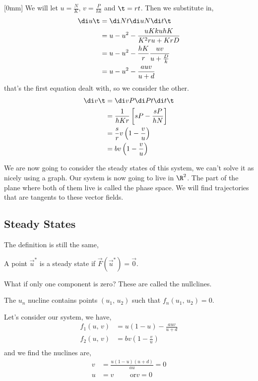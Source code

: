 
\noindent{}[0mm]
We will let $u = \frac{N}{K}$, $v = \frac{P}{hk}$ and $\t = rt$. Then we substitute in,
\begin{align*}
  \di u \t &= \di N t \di u N \di t \t\\
  &= u - u^2 - \frac{uKkuhK}{K^2ru + KrD}\\
  &= u - u^2 - \frac{hK}{r}\frac{uv}{u + \frac{D}{k}}\\
  &= u - u^2 - \frac{auv}{u + d}
\end{align*}
that's the first equation dealt with, so we consider the other.
\begin{align*}
  \di v \t &= \di v P \di P t \di t \t \\
  &= \frac{1}{hKr} \left[ sP - \frac{sP}{hN} \right]\\
  &= \frac{s}{r}v \left(1 - \frac{v}{u}\right)\\
  &= bv\left( 1 - \frac{v}{u} \right)
\end{align*}

We are now going to consider the steady states of this system, we can't solve it as nicely using a graph. Our system is now going to live in $\R^2$. The part of the plane where both of them live is called the phase space. We will find trajectories that are tangents to these vector fields.\\

\subsection{Steady States}
The definition is still the same,
\begin{ndefi}
  A point $\vec u^*$ is a steady state if $\vec F(\vec u^*) = \vec 0$.
\end{ndefi}
What if only one component is zero? These are called the nullclines.
\begin{ndefi}[Nullclines]
  The $u_n$ nucline contains points $(u_1,\,u_2)$ such that $f_n(u_1, \, u_2) = 0$.
\end{ndefi}

Let's consider our system, we have,
\begin{align*}
  f_1(u,\,v) &= u(1- u) - \frac{auv}{u + d}\\
  f_2(u,\,v) &= bv \left(1 - \frac{v}{u}\right)\\
\end{align*}
and we find the nuclines are,
\begin{align*}
  v &= \frac{u(1 - u)(u + d)}{au} = 0\\
  u &= v \qquad \text{ or} v = 0
\end{align*}

